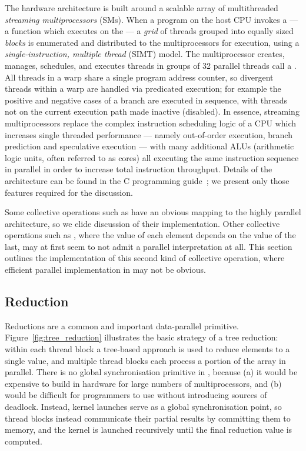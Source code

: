 The \CUDA hardware architecture is built around a scalable array of
multithreaded \emph{streaming multiprocessors} (SMs). When a \CUDA program on the
host CPU invokes a  --- a function which executes on the \GPU
--- a \emph{grid} of threads grouped into equally sized \emph{blocks} is
enumerated and distributed to the multiprocessors for execution, using a
\emph{single-instruction, multiple thread} (SIMT) model. The
multiprocessor creates, manages, schedules, and executes threads in groups of 32
parallel threads call a . All threads in a warp share a single
program address counter, so divergent threads within a warp are handled via
predicated execution; for example the positive and negative cases of a branch
are executed in sequence, with threads not on the current execution path made
inactive (disabled). In essence, streaming multiprocessors replace the complex
instruction scheduling logic of a CPU which increases single threaded
performance --- namely out-of-order execution, branch prediction and speculative
execution --- with many additional ALUs (arithmetic logic units, often referred
to as \CUDA cores) all executing the same instruction sequence in parallel in
order to increase total instruction throughput. Details of the \CUDA
architecture can be found in the \CUDA C programming
guide~\cite{NVIDIA:2012wf}; we present only those features required for the
discussion.

Some collective operations such as  have an obvious mapping to the
highly parallel \CUDA architecture, so we elide discussion of their
implementation. Other collective operations such as , where the value
of each element depends on the value of the last, may at first seem to not admit
a parallel interpretation at all. This section outlines the implementation of
this second kind of collective operation, where efficient parallel
implementation in \CUDA may not be obvious.


\subsection{Reduction}
\label{sec:parallel_reduction}

Reductions are a common and important data-parallel primitive.
Figure~\ref{fig:tree_reduction} illustrates the basic strategy of a tree
reduction: within each thread block a tree-based approach is used to reduce
elements to a single value, and multiple thread blocks each process a portion of
the array in parallel. There is no global synchronisation primitive in \CUDA,
because (a) it would be expensive to build in hardware for large numbers of
multiprocessors, and (b) would be difficult for programmers to use without
introducing sources of deadlock. Instead, kernel launches serve as a global
synchronisation point, so thread blocks instead communicate their partial
results by committing them to memory, and the kernel is launched recursively
until the final reduction value is computed.

